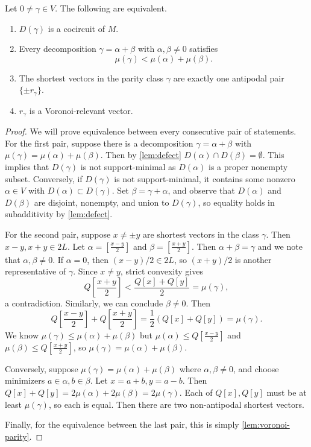 \documentclass[11pt,letterpaper]{amsart}
\begin{document}
\begin{proposition}\label{prop:cocircuit-shortest}
Let $0\ne\gamma\in V$.  The following are equivalent.
\begin{enumerate}
\item $D(\gamma)$ is a cocircuit of $M$.
\item Every decomposition $\gamma=\alpha+\beta$ with $\alpha,\beta\ne0$ satisfies
\[
  \mu(\gamma)<\mu(\alpha)+\mu(\beta).
\]
\item The shortest vectors in the parity class $\gamma$ are exactly one antipodal pair $\{\pm r_\gamma\}$.
\item $r_\gamma$ is a Voronoi-relevant vector.
\end{enumerate}
\end{proposition}
\begin{proof}
    We will prove equivalence between every consecutive pair of statements. For the first pair, suppose there is a decomposition $\gamma=\alpha+\beta$ with  $\mu(\gamma)=\mu(\alpha)+\mu(\beta)$. Then by \cref{lem:defect} $D(\alpha) \cap D(\beta) = \emptyset$. This implies that $D(\gamma)$ is not support-minimal as $D(\alpha)$ is a proper nonempty subset. Conversely, if $D(\gamma)$ is not support-minimal, it contains some nonzero $\alpha \in V$ with $D(\alpha) \subset D(\gamma)$. Set $\beta=\gamma+\alpha$, and observe that $D(\alpha)$ and $D(\beta)$ are disjoint, nonempty, and union to $D(\gamma)$, so equality holds in subadditivity by \cref{lem:defect}.

    For the second pair, suppose $x \neq \pm y$ are shortest vectors in the class $\gamma$. Then $x-y, x+y \in 2L$. Let $\alpha = \left[ \frac{x-y}{2}\right]$ and $\beta = \left[ \frac{x+y}{2}\right]$. 
   Then $\alpha + \beta = \gamma$ and we note that $\alpha,\beta\neq0$. If $\alpha=0$, then
$(x-y)/2\in2L$, so $(x+y)/2$ is another representative of
$\gamma$. Since $x\neq y$, strict convexity gives
\[
    Q\left[\frac{x+y}{2}\right]
    <\frac{Q[x]+Q[y]}{2}
    =\mu(\gamma),
\]
a contradiction. Similarly, we can conclude $\beta \neq 0$.
Then $$Q\left[ \frac{x-y}{2}\right] + Q\left[ \frac{x+y}{2}\right] = \frac{1}{2}(Q[x] + Q[y]) = \mu(\gamma).$$
    We know $\mu(\gamma) \leq \mu(\alpha) + \mu(\beta)$ but $\mu(\alpha) \leq Q\left[ \frac{x-y}{2}\right]$ and $\mu(\beta) \leq Q\left[ \frac{x+y}{2}\right]$, so $\mu(\gamma) = \mu(\alpha) + \mu(\beta)$.

    Conversely, suppose $\mu(\gamma) = \mu(\alpha) + \mu(\beta)$ where $\alpha,\beta\neq0$, and choose minimizers $a \in \alpha, b \in \beta$. Let $x = a+b, y = a-b$. Then $Q[x] + Q [y] = 2\mu(\alpha) + 2 \mu(\beta) = 2\mu(\gamma)$. Each of $Q[x], Q[y]$ must be at least $\mu(\gamma)$, so each is equal. Then there are two non-antipodal shortest vectors.

    Finally, for the equivalence between the last pair, this is simply \cref{lem:voronoi-parity}.

\end{proof}
\end{document}
